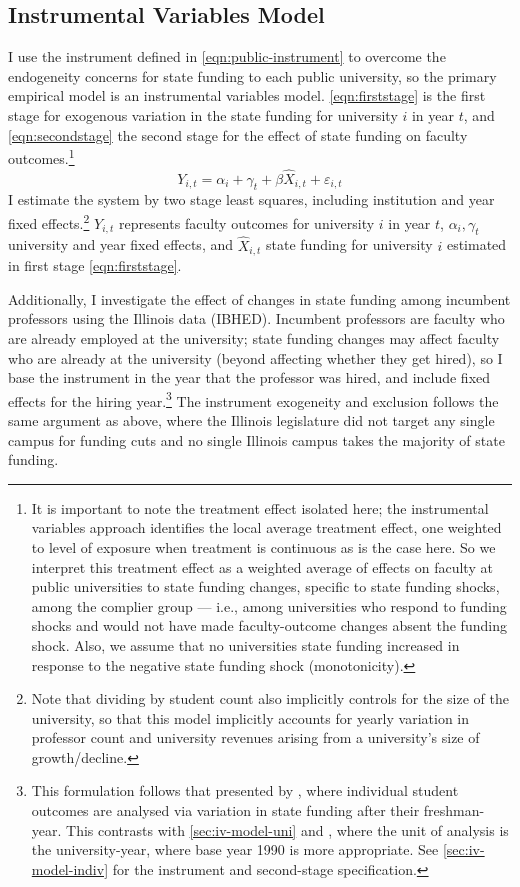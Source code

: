 \subsection{Instrumental Variables Model}
\label{sec:iv-model-uni}

I use the instrument defined in \autoref{eqn:public-instrument} to overcome the endogeneity concerns for state funding to each public university, so the primary empirical model is an instrumental variables model.
\autoref{eqn:firststage} is the first stage for exogenous variation in the state funding for university $i$ in year $t$, and \autoref{eqn:secondstage} the second stage for the effect of state funding on faculty outcomes.\footnote{
    It is important to note the treatment effect isolated here; the instrumental variables approach identifies the local average treatment effect, one weighted to level of exposure when treatment is continuous as is the case here.
    So we interpret this treatment effect as a weighted average of effects on faculty at public universities to state funding changes, specific to state funding shocks, among the complier group --- i.e., among universities who respond to funding shocks and would not have made faculty-outcome changes absent the funding shock.
    Also, we assume that no universities state funding increased in response to the negative state funding shock (monotonicity).
}
\begin{equation}
    \label{eqn:secondstage}
    Y_{i,t} = \alpha_i + \gamma_t + \beta \widehat X_{i,t} + \varepsilon_{i,t}
\end{equation}
I estimate the system by two stage least squares, including institution and year fixed effects.\footnote{
    Note that dividing by student count also implicitly controls for the size of the university, so that this model implicitly accounts for yearly variation in professor count and university revenues arising from a university's size of growth/decline.
}
$Y_{i,t}$ represents faculty outcomes for university $i$ in year $t$, $\alpha_i, \gamma_t$ university and year fixed effects, and $\widehat X_{i,t}$ state funding for university $i$ estimated in first stage \eqref{eqn:firststage}.

Additionally, I investigate the effect of changes in state funding among incumbent professors using the Illinois data (IBHED).
Incumbent professors are faculty who are already employed at the university; state funding changes may affect faculty who are already at the university (beyond affecting whether they get hired), so I base the instrument in the year that the professor was hired, and include fixed effects for the hiring year.\footnote{
    This formulation follows that presented by \cite{NBERw27885}, where individual student outcomes are analysed via variation in state funding after their freshman-year.
    This contrasts with \autoref{sec:iv-model-uni} and \cite{NBERw23736}, where the unit of analysis is the university-year, where base year 1990 is more appropriate.
    See \autoref{sec:iv-model-indiv} for the instrument and second-stage specification.
}
The instrument exogeneity and exclusion follows the same argument as above, where the Illinois legislature did not target any single campus for funding cuts and no single Illinois campus takes the majority of state funding.

